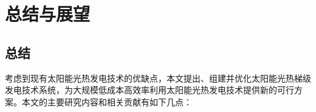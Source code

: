\chapter{总结与展望}
\section{总结}

考虑到现有太阳能光热发电技术的优缺点，本文提出、组建并优化太阳能光热梯级发电技术系统，为大规模低成本高效率利用太阳能光热发电技术提供新的可行方案。本文的主要研究内容和相关贡献有如下几点：

